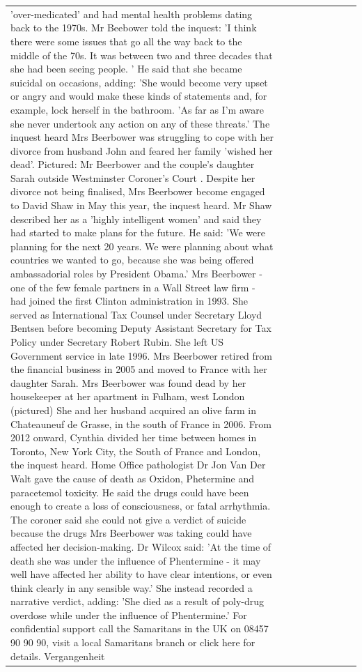 \begin{table}[H]
\begin{tabular}{lllrlllll}
'over-medicated' and had mental health problems dating back to the 1970s. Mr Beebower told the inquest: 'I think there were some issues that go all the way back to the middle of the 70s. It was between two and three decades that she had been seeing people. ' He said that she became suicidal on occasions, adding: 'She would become very upset or angry and would make these kinds of statements and, for example, lock herself in the bathroom. 'As far as I'm aware she never undertook any action on any of these threats.' The inquest heard Mrs Beerbower was struggling to cope with her divorce from husband John and feared her family 'wished her dead'. Pictured: Mr Beerbower and the couple's daughter Sarah outside Westminster Coroner's Court . Despite her divorce not being finalised, Mrs Beerbower become engaged to David Shaw in May this year, the inquest heard. Mr Shaw described her as a 'highly intelligent women' and said they had started to make plans for the future. He said: 'We were planning for the next 20 years. We were planning about what countries we wanted to go, because she was being offered ambassadorial roles by President Obama.' Mrs Beerbower - one of the few female partners in a Wall Street law firm - had joined the first Clinton administration in 1993. She served as International Tax Counsel under Secretary Lloyd Bentsen before becoming Deputy Assistant Secretary for Tax Policy under Secretary Robert Rubin. She left US Government service in late 1996. Mrs Beerbower retired from the financial business in 2005 and moved to France with her daughter Sarah. Mrs Beerbower was found dead by her housekeeper at her apartment in Fulham, west London (pictured) She and her husband acquired an olive farm in Chateauneuf de Grasse, in the south of France in 2006. From 2012 onward, Cynthia divided her time between homes in Toronto, New York City, the South of France and London, the inquest heard. Home Office pathologist Dr Jon Van Der Walt gave the cause of death as Oxidon, Phetermine and paracetemol toxicity. He said the drugs could have been enough to create a loss of consciousness, or fatal arrhythmia. The coroner said she could not give a verdict of suicide because the drugs Mrs Beerbower was taking could have affected her decision-making. Dr Wilcox said: 'At the time of death she was under the influence of Phentermine - it may well have affected her ability to have clear intentions, or even think clearly in any sensible way.' She instead recorded a narrative verdict, adding: 'She died as a result of poly-drug overdose while under the influence of Phentermine.' For confidential support call the Samaritans in the UK on 08457 90 90 90, visit a local Samaritans branch or click here for details. Vergangenheit \\

\end{tabular}
\end{table}
